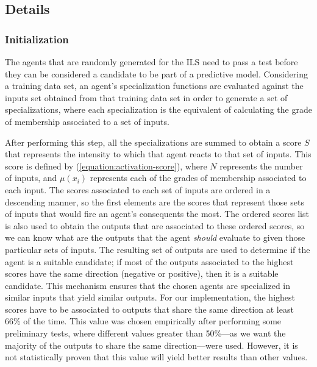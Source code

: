 \documentclass{ieeeaccess}
\begin{document}
\subsection{Details}
\label{subsection:details}

\subsubsection{Initialization}
\label{subsubsection:initialization}

The agents that are randomly generated for the ILS need to pass a test before they can be considered a candidate to be part of a predictive model. Considering a training data set, an agent's specialization functions are evaluated against the inputs set obtained from that training data set in order to generate a set of specializations, where each specialization is the equivalent of calculating the grade of membership associated to a set of inputs. 


After performing this step, all the specializations are summed to obtain a score $S$ that represents the intensity to which that agent reacts to that set of inputs. This score is defined by (\ref{equation:activation-score}), where $N$ represents the number of inputs, and $\mu(x_{i})$ represents each of the grades of membership associated to each input. The scores associated to each set of inputs are ordered in a descending manner, so the first elements are the scores that represent those sets of inputs that would fire an agent's consequents the most. The ordered scores list is also used to obtain the outputs that are associated to these ordered scores, so we can know what are the outputs that the agent \textit{should} evaluate to given those particular sets of inputs. The resulting set of outputs are used to determine if the agent is a suitable candidate; if most of the outputs associated to the highest scores have the same direction (negative or positive), then it is a suitable candidate. This mechanism ensures that the chosen agents are specialized in similar inputs that yield similar outputs. For our implementation, the highest scores have to be associated to outputs that share the same direction at least 66\% of the time. This value was chosen empirically after performing some preliminary tests, where different values greater than 50\%---as we want the majority of the outputs to share the same direction---were used. However, it is not statistically proven that this value will yield better results than other values.
\end{document}
